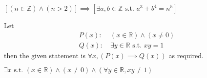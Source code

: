 \begin{questions}
    \item $\left[(n \in \mathbb{Z}) \land (n > 2)\right] \implies \left[\exists a, b \in \mathbb{Z} \text{ s.t. } a^3 + b^4 = n^5\right]$

    \item \begin{partquestions}{\roman*}
        \item Let
        \begin{align*}
            P(x):&\ (x \in \mathbb{R}) \land (x \neq 0)\\
            Q(x):&\ \exists y \in \mathbb{R} \text{ s.t. } xy = 1
        \end{align*}
        then the given statement is $\forall x, (P(x) \implies Q(x))$ as required.

        \item $\exists x \text{ s.t. } (x \in \mathbb{R}) \land (x \neq 0) \land (\forall y \in \mathbb{R}, xy \neq 1)$
    \end{partquestions}
\end{questions}
